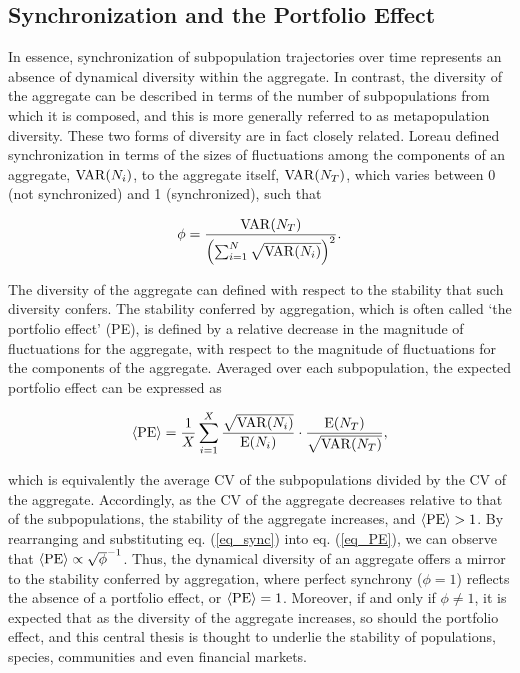 \documentclass{article}
\begin{document}
\subsection{Synchronization and the Portfolio Effect}

In essence, synchronization of subpopulation trajectories over time represents an absence of dynamical diversity within the aggregate.
In contrast, the diversity of the aggregate can be described in terms of the number of subpopulations from which it is composed, and this is more generally referred to as metapopulation diversity.
These two forms of diversity are in fact closely related.
Loreau defined synchronization in terms of the sizes of fluctuations among the components of an aggregate, ${\rm VAR}(N_i)$, to the aggregate itself, ${\rm VAR}(N_T)$, which varies between 0 (not synchronized) and 1 (synchronized), such that

\begin{equation}
\label{eq_sync}
\phi = \frac{{\rm VAR}(N_T)}{\left(\sum_{i=1}^N\sqrt{{\rm VAR}(N_i)}\right)^2}.
\end{equation}

The diversity of the aggregate can defined with respect to the stability that such diversity confers.
The stability conferred by aggregation, which is often called `the portfolio effect' (PE), is defined by a relative decrease in the magnitude of fluctuations for the aggregate, with respect to the magnitude of fluctuations for the components of the aggregate.
Averaged over each subpopulation, the expected portfolio effect can be expressed as

\begin{equation}
\label{eq_PE}
\langle{\rm PE}\rangle =\frac{1}{X}\sum_{i=1}^X \frac{\sqrt{{\rm VAR}(N_i)}}{{\rm E}(N_i)}\cdot \frac{{\rm E}(N_T)}{\sqrt{{\rm VAR}(N_T)}},
\end{equation}

\noindent which is equivalently the average CV of the subpopulations divided by the CV of the aggregate.
Accordingly, as the CV of the aggregate decreases relative to that of the subpopulations, the stability of the aggregate increases, and $\langle{\rm PE}\rangle > 1$.
By rearranging and substituting eq. (\ref{eq_sync}) into eq. (\ref{eq_PE}), we can observe that $\langle{\rm PE}\rangle \propto \sqrt{\phi}^{-1}$.
Thus, the dynamical diversity of an aggregate offers a mirror to the stability conferred by aggregation, where perfect synchrony ($\phi = 1$) reflects the absence of a portfolio effect, or $\langle{\rm PE}\rangle = 1$.
Moreover, if and only if $\phi \neq 1$, it is expected that as the diversity of the aggregate increases, so should the portfolio effect, and this central thesis is thought to underlie the stability of populations, species, communities and even financial markets.
\end{document}
